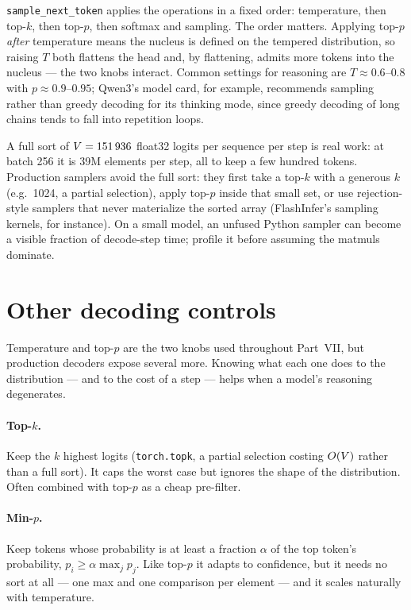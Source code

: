 \texttt{sample\_next\_token} applies the operations in a fixed order: temperature, then top-$k$,
then top-$p$, then softmax and sampling. The order matters. Applying top-$p$ \emph{after}
temperature means the nucleus is defined on the tempered distribution, so raising $T$ both flattens
the head and, by flattening, admits more tokens into the nucleus --- the two knobs interact. Common
settings for reasoning are $T \approx 0.6$--$0.8$ with $p \approx 0.9$--$0.95$; Qwen3's model card,
for example, recommends sampling rather than greedy decoding for its thinking mode, since greedy
decoding of long chains tends to fall into repetition loops.

\begin{systemslens}
A full sort of $V = \num{151936}$ float32 logits per sequence per step is real work: at batch
256 it is 39M elements per step, all to keep a few hundred tokens. Production samplers avoid the
full sort: they first take a top-$k$ with a generous $k$ (e.g.\ 1024, a partial selection), apply
top-$p$ inside that small set, or use rejection-style samplers that never materialize the sorted
array (FlashInfer's sampling kernels, for instance). On a small model, an unfused Python sampler
can become a visible fraction of decode-step time; profile it before assuming the matmuls dominate.
\end{systemslens}


\section{Other decoding controls}\label{sec:scaling:otherdecoding}

Temperature and top-$p$ are the two knobs used throughout Part~VII, but production decoders expose
several more. Knowing what each one does to the distribution --- and to the cost of a step --- helps
when a model's reasoning degenerates.

\paragraph{Top-$k$.} Keep the $k$ highest logits (\texttt{torch.topk}, a partial selection costing
$O(V)$ rather than a full sort). It caps the worst case but ignores the shape of the
distribution. Often combined with top-$p$ as a cheap pre-filter.

\paragraph{Min-$p$.} Keep tokens whose probability is at least a fraction $\alpha$ of the top token's
probability, $p_i \ge \alpha \max_j p_j$. Like top-$p$ it adapts to confidence, but it needs no sort
at all --- one max and one comparison per element --- and it scales naturally with temperature.

